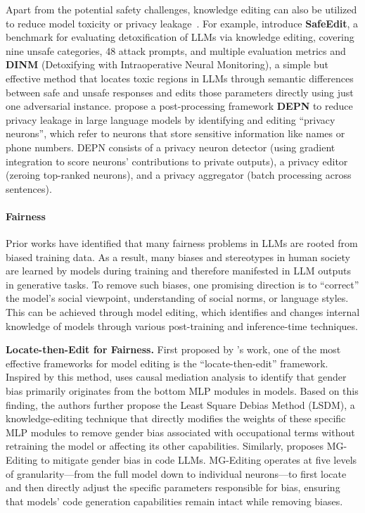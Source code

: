 Apart from the potential safety challenges, knowledge editing can also be utilized to reduce model toxicity or privacy leakage~\citep{wu2023depn,wang2024detoxifying,uppaal2024model}. For example, \citet{wang2024detoxifying}  introduce \textbf{SafeEdit}, a benchmark for evaluating detoxification of LLMs via knowledge editing, covering nine unsafe categories, 48 attack prompts, and multiple evaluation metrics and \textbf{DINM} (Detoxifying with Intraoperative Neural Monitoring), a simple but effective method that locates toxic regions in LLMs through semantic differences between safe and unsafe responses and edits those parameters directly using just one adversarial instance. \citet{wu2023depn} propose a post-processing framework \textbf{DEPN} to reduce privacy leakage in large language models by identifying and editing ``privacy neurons'', which refer to neurons that store sensitive information like names or phone numbers. DEPN consists of a privacy neuron detector (using gradient integration to score neurons' contributions to private outputs), a privacy editor (zeroing top-ranked neurons), and a privacy aggregator (batch processing across sentences).


\paragraph{Fairness}
Prior works have identified that many fairness problems in LLMs are rooted from biased training data. 
As a result, many biases and stereotypes in human society are learned by models during training and therefore manifested in LLM outputs in generative tasks.
To remove such biases, one promising direction is to ``correct'' the model's social viewpoint, understanding of social norms, or language styles.
This can be achieved through model editing, which identifies and changes internal knowledge of models through various post-training and inference-time techniques.

\textbf{Locate-then-Edit for Fairness.} First proposed by \citet{meng2022locating}'s work, one of the most effective frameworks for model editing is the ``locate-then-edit'' framework.
Inspired by this method, \citet{cai2024locating} uses causal mediation analysis to identify that gender bias primarily originates from the bottom MLP modules in models. 
Based on this finding, the authors further propose the Least Square Debias Method (LSDM), a knowledge-editing technique that directly modifies the weights of these specific MLP modules to remove gender bias associated with occupational terms without retraining the model or affecting its other capabilities.
Similarly, \citet{qin2024mitigating} proposes MG-Editing to mitigate gender bias in code LLMs.
MG-Editing operates at five levels of granularity—from the full model down to individual neurons—to first locate and then directly adjust the specific parameters responsible for bias, ensuring that models' code generation capabilities remain intact while removing biases.

